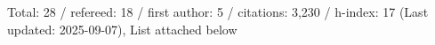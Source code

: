Total: 28 / refereed: 18 / first author: 5 / citations: 3,230 / h-index: 17 (Last updated: 2025-09-07), List attached below